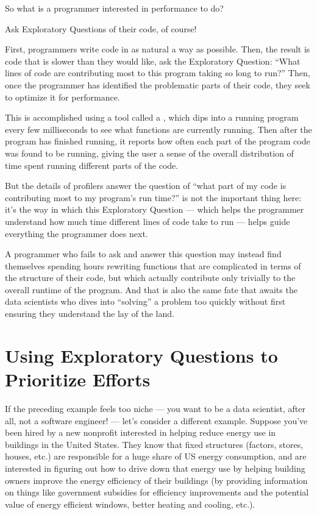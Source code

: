 \documentclass[letterpaper,10pt,english]{jupyterBook}
\begin{document}
\sphinxAtStartPar
So what is a programmer interested in performance to do?

\sphinxAtStartPar
Ask Exploratory Questions of their code, of course!

\sphinxAtStartPar
First, programmers write code in as natural a way as possible. Then,  the result is code that is slower than they would like, ask the Exploratory Question: “What lines of code are contributing most to this program taking so long to run?” Then, once the programmer has identified the problematic parts of their code, they seek to optimize it for performance.

\sphinxAtStartPar
This is accomplished using a tool called a , which dips into a running program every few milliseconds to see what functions are currently running. Then after the program has finished running, it reports how often each part of the program code was found to be running, giving the user a sense of the overall distribution of time spent running different parts of the code.

\sphinxAtStartPar
But the details of  profilers answer the question of “what part of my code is contributing most to my program’s run time?” is not the important thing here: it’s the way in which this Exploratory Question — which helps the programmer understand how much time different lines of code take to run  — helps guide everything the programmer does next.

\sphinxAtStartPar
A programmer who fails to ask and answer this question may instead find themselves spending hours re\sphinxhyphen{}writing functions that are complicated in terms of the structure of their code, but which actually contribute only trivially to the overall runtime of the program. And that is also the same fate that awaits the data scientists who dives into “solving” a problem too quickly without first ensuring they understand the lay of the land.


\section{Using Exploratory Questions to Prioritize Efforts}
\label{\detokenize{30_questions/10_using_exploratory_questions:using-exploratory-questions-to-prioritize-efforts}}
\sphinxAtStartPar
If the preceding example feels too niche — you want to be a data scientist, after all, not a software engineer! — let’s consider a different example. Suppose you’ve been hired by a new non\sphinxhyphen{}profit interested in helping reduce energy use in buildings in the United States. They know that fixed structures (factors, stores, houses, etc.) are responsible for a huge share of US energy consumption, and are interested in figuring out how to drive down that energy use by helping building owners improve the energy efficiency of their buildings (by providing information on things like government subsidies for efficiency improvements and the potential value of energy efficient windows, better heating and cooling, etc.).
\end{document}
